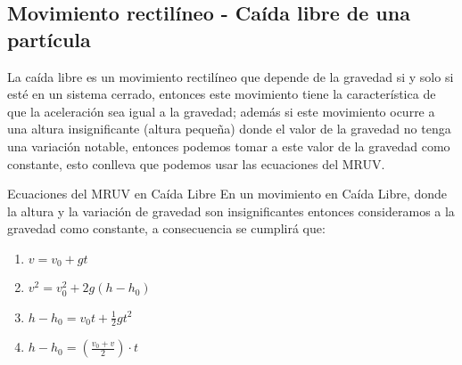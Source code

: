 \subsection*{Movimiento rectilíneo - Caída libre de una partícula}
La caída libre es un movimiento rectilíneo que depende de la gravedad si y solo si esté en un sistema cerrado, entonces este movimiento tiene la característica de que la aceleración sea igual a la gravedad; además si este movimiento ocurre a una altura insignificante (altura pequeña) donde el valor de la gravedad no tenga una variación notable, entonces podemos tomar a este valor de la gravedad como constante, esto conlleva que podemos usar las ecuaciones del MRUV.
\begin{Theorem*} {Ecuaciones del MRUV en Caída Libre}
	En un movimiento en Caída Libre, donde la altura y la variación de gravedad son insignificantes entonces consideramos a la gravedad como constante, a consecuencia se cumplirá que:
	\begin{enumerate}
		\item $v=v_0+gt$
		\item $v^2=v_0^2+2g(h-h_0)$
		\item $h-h_0=v_0t+\frac{1}{2}gt^2$
		\item $h-h_0=\left(\frac{v_0+v}{2}\right)\cdot t$
	\end{enumerate}
\end{Theorem*}

